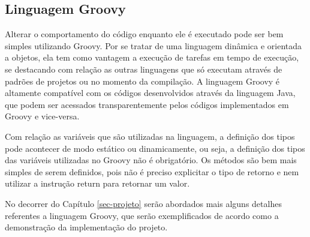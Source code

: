 \subsection{Linguagem Groovy}
\label{sec-ref-linguagem-groovy}


Alterar o comportamento do código enquanto ele é executado pode ser bem simples utilizando Groovy. Por se tratar de uma linguagem dinâmica e orientada a objetos, ela tem como vantagem a execução de tarefas em tempo de execução, se destacando com relação as outras linguagens que só executam através de padrões de projetos ou no momento da compilação. A linguagem Groovy é altamente compatível com os códigos desenvolvidos através da linguagem Java, que podem ser acessados transparentemente pelos códigos implementados em Groovy e vice-versa.

Com relação as variáveis que são utilizadas na linguagem, a definição dos tipos pode acontecer de modo estático ou dinamicamente, ou seja, a definição dos tipos das variáveis utilizadas no Groovy não é obrigatório. Os métodos são bem mais simples de serem definidos, pois não é preciso explicitar o tipo de retorno e nem utilizar a instrução return para retornar um valor.

No decorrer do Capítulo \ref{sec-projeto} serão abordados mais alguns detalhes referentes a linguagem Groovy, que serão exemplificados de acordo como a demonstração da implementação do projeto.         



       